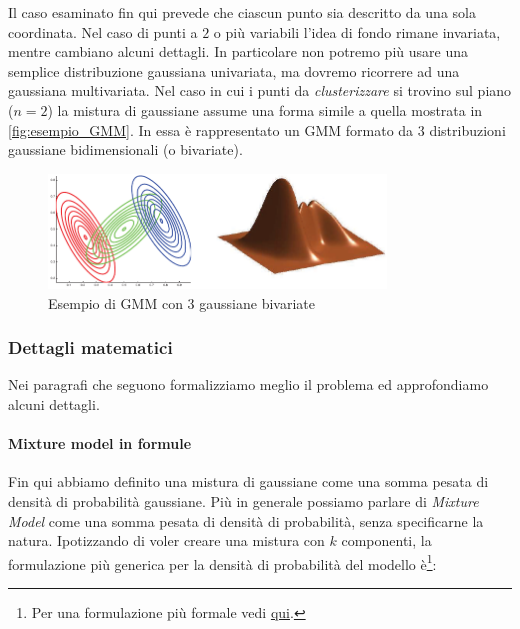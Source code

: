 Il caso esaminato fin qui prevede che ciascun punto sia descritto da una sola coordinata. Nel caso di punti a $2$ o più variabili l'idea di fondo rimane invariata, mentre cambiano alcuni dettagli. In particolare non potremo più usare una semplice distribuzione gaussiana univariata, ma dovremo ricorrere ad una gaussiana multivariata. Nel caso in cui i punti da \emph{clusterizzare} si trovino sul piano ($n=2$) la mistura di gaussiane assume una forma simile a quella mostrata in \autoref{fig:esempio_GMM}. In essa è rappresentato un GMM formato da $3$ distribuzioni gaussiane bidimensionali (o bivariate).



\begin{figure}[tbp]
\centering
  \includegraphics[width = 0.8\textwidth]{images/esempio_GMM}
  \caption{Esempio di GMM con 3 gaussiane bivariate}
  \label{fig:esempio_GMM}
\end{figure}

\subsubsection{Dettagli matematici}
Nei paragrafi che seguono formalizziamo meglio il problema ed approfondiamo alcuni dettagli. 

\paragraph{Mixture model in formule}
Fin qui abbiamo definito una mistura di gaussiane come una somma pesata di densità di probabilità gaussiane. Più in generale possiamo parlare di \emph{Mixture Model} come una somma pesata di densità di probabilità, senza specificarne la natura. Ipotizzando di voler creare una mistura con $k$ componenti, la formulazione più generica per la densità di probabilità del modello è\footnote{Per una formulazione più formale vedi \href{http://www.youtube.com/watch?v=Rkl30Fr2S38}{qui}.}:

